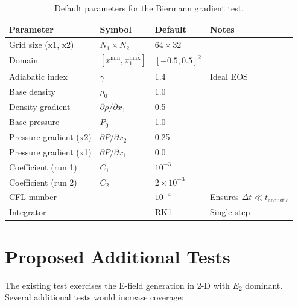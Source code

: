 \documentclass[11pt]{article}
\begin{document}
\begin{table}[h]
  \centering
  \caption{Default parameters for the Biermann gradient test.}
  \label{tab:params}
  \begin{tabular}{llll}
    \toprule
    Parameter & Symbol & Default & Notes \\
    \midrule
    Grid size (x1, x2) & $N_1\times N_2$ & $64\times32$ & \\
    Domain & $[x_1^\mathrm{min},x_1^\mathrm{max}]$ & $[-0.5,0.5]^2$ & \\
    Adiabatic index & $\gamma$ & 1.4 & Ideal EOS \\
    Base density & $\rho_0$ & 1.0 & \\
    Density gradient & $\partial\rho/\partial x_1$ & 0.5 & \\
    Base pressure & $P_0$ & 1.0 & \\
    Pressure gradient (x2) & $\partial P/\partial x_2$ & 0.25 & \\
    Pressure gradient (x1) & $\partial P/\partial x_1$ & 0.0 & \\
    Coefficient (run 1) & $C_1$ & $10^{-3}$ & \\
    Coefficient (run 2) & $C_2$ & $2\times10^{-3}$ & \\
    CFL number & --- & $10^{-4}$ & Ensures $\Delta t \ll t_\mathrm{acoustic}$ \\
    Integrator & --- & RK1 & Single step \\
    \bottomrule
  \end{tabular}
\end{table}

\section{Proposed Additional Tests}
\label{sec:future_tests}

The existing test exercises the E-field generation in 2-D with $E_2$ dominant.
Several additional tests would increase coverage:
\end{document}
